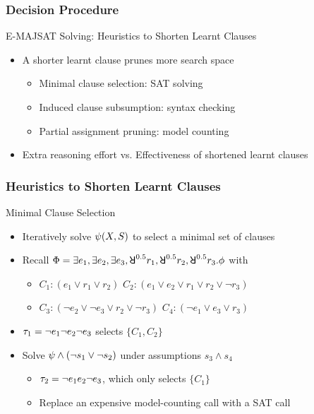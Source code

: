 \begin{frame}
    \frametitle{Decision Procedure}
    \begin{block}{E-MAJSAT Solving: Heuristics to Shorten Learnt Clauses}
        \begin{itemize}
            \item A shorter learnt clause prunes more search space
                  \pause
                  \begin{itemize}
                      \item Minimal clause selection: SAT solving
                            \pause
                      \item Induced clause subsumption: syntax checking
                            \pause
                      \item Partial assignment pruning: model counting
                            \pause
                  \end{itemize}
            \item Extra reasoning effort vs. Effectiveness of shortened learnt clauses
        \end{itemize}
    \end{block}
\end{frame}

\begin{frame}
    \frametitle{Heuristics to Shorten Learnt Clauses}
    \begin{block}{Minimal Clause Selection}
        \begin{itemize}
            \item Iteratively solve $\psi(X,S)$ to select a minimal set of clauses
                  \pause
            \item Recall $\Qf=\exists e_1,\exists e_2,\exists e_3,\random{0.5} r_1,\random{0.5} r_2,\random{0.5} r_3.\pf$ with
                  \begin{itemize}
                      \item[] $C_1: (e_1 \lor r_1 \lor r_2)$ $C_2: (e_1 \lor e_2 \lor r_1 \lor r_2 \lor \lnot r_3)$
                      \item[] $C_3: (\lnot e_2 \lor \lnot e_3 \lor r_2 \lor \lnot r_3)$ $C_4: (\lnot e_1 \lor e_3 \lor r_3)$
                  \end{itemize}
                  \pause
            \item $\tau_1=\lnot e_1 \lnot e_2 \lnot e_3$ selects $\{C_1,C_2\}$
                  \pause
            \item Solve $\psi\land(\lnot s_1\lor\lnot s_2)$ under assumptions $s_3\land s_4$
                  \pause
                  \begin{itemize}
                      \item $\tau_2=\lnot e_1 e_2 \lnot e_3$, which only selects $\{C_1\}$
                            \pause
                      \item Replace an expensive model-counting call with a SAT call
                  \end{itemize}
        \end{itemize}
    \end{block}
\end{frame}

